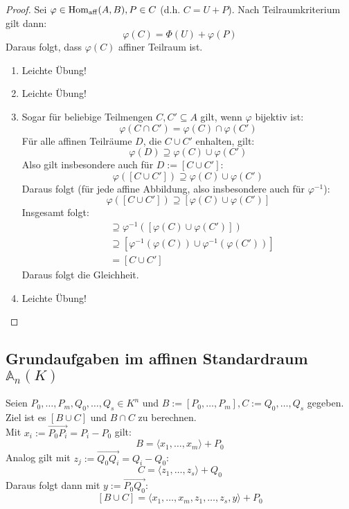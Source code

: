 \documentclass[parskip,a4paper,twoside,DIV15,BCOR12mm]{scrbook}
\begin{document}
\begin{proof}
Sei $\varphi\in\operatorname{Hom_{aff}}(A,B), P\in C$ (d.h. $C=U+P$). Nach Teilraumkriterium gilt dann:
\[\varphi(C)=\Phi(U)+\varphi(P)\]
Daraus folgt, dass $\varphi(C)$ affiner Teilraum ist.
\begin{enumerate}
\item Leichte Übung!
\item Leichte Übung!
\item Sogar für beliebige Teilmengen $C,C'\subseteq A$ gilt, wenn $\varphi$ bijektiv ist:
\[\varphi(C\cap C')=\varphi(C)\cap\varphi(C')\]
Für alle affinen Teilräume $D$, die $C\cup C'$ enhalten, gilt:
\[\varphi(D)\supseteq\varphi(C)\cup\varphi(C')\]
Also gilt insbesondere auch für $D:=[C\cup C']$:
\[\varphi([C\cup C'])\supseteq\varphi(C)\cup\varphi(C')\]
Daraus folgt (für jede affine Abbildung, also insbesondere auch für $\varphi^{-1}$):
\[\varphi([C\cup C'])\supseteq[\varphi(C)\cup\varphi(C')]\]
Insgesamt folgt:
\begin{align*}
[C\cup C']&\supseteq\varphi^{-1}([\varphi(C)\cup\varphi(C')])\\
&\supseteq[\varphi^{-1}(\varphi(C))\cup\varphi^{-1}(\varphi(C'))]\\
&= [C\cup C']
\end{align*}
Daraus folgt die Gleichheit.
\item Leichte Übung!
\end{enumerate}
\end{proof}

\subsection{Grundaufgaben im affinen Standardraum $\mathbb{A}_n(K)$}
Seien $P_0,\ldots,P_m,Q_0,\ldots,Q_s\in K^n$ und $B:=[P_0,\ldots,P_m], C:=Q_0,\ldots,Q_s$
gegeben. Ziel ist es $[B\cup C]$ und $B\cap C$ zu berechnen.\\

Mit $x_i:=\overrightarrow{P_0P_i}=P_i-P_0$ gilt:
\[B=\langle x_1,\ldots,x_m\rangle+P_0\]
Analog gilt mit $z_j:=\overrightarrow{Q_0Q_i}=Q_i-Q_0$:
\[C=\langle z_1,\ldots,z_s\rangle+Q_0\]
Daraus folgt dann mit $y:=\overrightarrow{P_0Q_0}$:
\[[B\cup C]=\langle x_1,\ldots,x_m,z_1,\ldots,z_s,y\rangle+P_0\]
\end{document}
